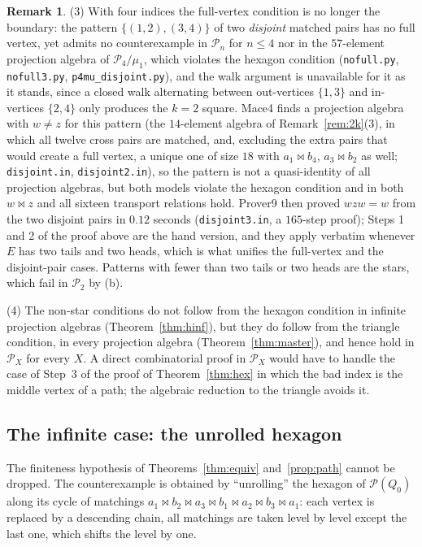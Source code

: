 \documentclass[11pt]{amsart}
\theoremstyle{definition}
\newtheorem{remark}[theorem]{Remark}
\renewcommand{\P}{\mathcal{P}}
\newcommand{\mt}{\bowtie}   %
\begin{document}
\begin{remark}
(3) With four indices the full-vertex condition is no longer the boundary: the pattern $\{(1,2),(3,4)\}$ of two \emph{disjoint} matched pairs has no full vertex, yet admits no counterexample in $\P_n$ for $n\le4$ nor in the $57$-element projection algebra of $\P_4/\mu_1$, which violates the hexagon condition (\texttt{nofull.py}, \texttt{nofull3.py}, \texttt{p4mu\_disjoint.py}), and the walk argument is unavailable for it as it stands, since a closed walk alternating between out-vertices $\{1,3\}$ and in-vertices $\{2,4\}$ only produces the $k=2$ square. Mace4 finds a projection algebra with $w\ne z$ for this pattern (the $14$-element algebra of Remark~\ref{rem:2k}(3), in which all twelve cross pairs are matched, and, excluding the extra pairs that would create a full vertex, a unique one of size $18$ with $a_1\mt b_4$, $a_3\mt b_2$ as well; \texttt{disjoint.in}, \texttt{disjoint2.in}), so the pattern is not a quasi-identity of all projection algebras, but both models violate the hexagon condition and in both $w\mt z$ and all sixteen transport relations hold. Prover9 then proved $wzw=w$ from the two disjoint pairs in $0.12$ seconds (\texttt{disjoint3.in}, a $165$-step proof); Steps 1 and 2 of the proof above are the hand version, and they apply verbatim whenever $E$ has two tails and two heads, which is what unifies the full-vertex and the disjoint-pair cases. Patterns with fewer than two tails or two heads are the stars, which fail in $\P_2$ by (b).

(4) The non-star conditions do not follow from the hexagon condition in infinite projection algebras (Theorem~\ref{thm:hinf}), but they do follow from the triangle condition, in every projection algebra (Theorem~\ref{thm:master}), and hence hold in $\P_X$ for every $X$. A direct combinatorial proof in $\P_X$ would have to handle the case of Step~3 of the proof of Theorem~\ref{thm:hex} in which the bad index is the middle vertex of a path; the algebraic reduction to the triangle avoids it.
\end{remark}

\subsection{The infinite case: the unrolled hexagon}\label{subsec:hinf}

The finiteness hypothesis of Theorems~\ref{thm:equiv} and~\ref{prop:path} cannot be dropped. The counterexample is obtained by ``unrolling'' the hexagon of $\P(Q_0)$ along its cycle of matchings $a_1\mt b_2\mt a_3\mt b_1\mt a_2\mt b_3\mt a_1$: each vertex is replaced by a descending chain, all matchings are taken level by level except the last one, which shifts the level by one.
\end{document}
